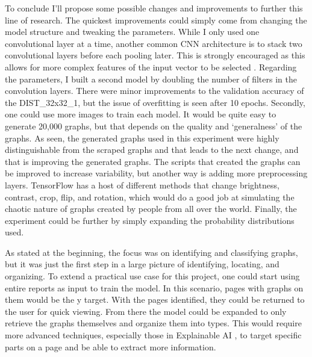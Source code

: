 \documentclass[12pt]{article}
\begin{document}
            To conclude I’ll propose some possible changes and improvements to further this line of research. 
            The quickest improvements could simply come from changing the model structure and tweaking the parameters. 
            While I only used one convolutional layer at a time, 
            another common CNN architecture is to stack two convolutional layers before each pooling later. 
            This is strongly encouraged as this allows for more complex features of the input vector to be selected \cite{oshea2015}. 
            Regarding the parameters, I built a second model by doubling the number of filters in the convolution layers. 
            There were minor improvements to the validation accuracy of the DIST\_32x32\_1, 
            but the issue of overfitting is seen after 10 epochs. Secondly, one could use more images to train each model. 
            It would be quite easy to generate 20,000 graphs, but that depends on the quality and ‘generalness’ of the graphs. 
            As seen, the generated graphs used in this experiment were highly distinguishable from the scraped graphs 
            and that leads to the next change, and that is improving the generated graphs. 
            The scripts that created the graphs can be improved to increase variability, 
            but another way is adding more preprocessing layers. TensorFlow has a host of different methods 
            that change brightness, contrast, crop, flip, and rotation, 
            which would do a good job at simulating the chaotic nature of graphs created by people from all over the world. 
            Finally, the experiment could be further by simply expanding the probability distributions used.
            
            As stated at the beginning, the focus was on identifying and classifying graphs, 
            but it was just the first step in a large picture of identifying, locating, and organizing. 
            To extend a practical use case for this project, one could start using entire reports as input to train the model. 
            In this scenario, pages with graphs on them would be the y target. 
            With the pages identified, they could be returned to the user for quick viewing. 
            From there the model could be expanded to only retrieve the graphs themselves and organize them into types. 
            This would require more advanced techniques, 
            especially those in Explainable AI \cite{kamakshi2023}, 
            to target specific parts on a page and be able to extract more information.
        
\end{document}
